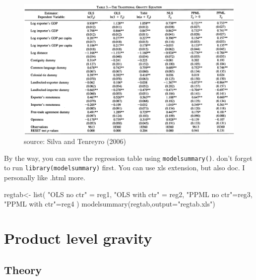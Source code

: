 \documentclass[
  a4paper,
  DIV=11,
  numbers=noendperiod]{scrreprt}
\newenvironment{Shaded}{\begin{snugshade}}{\end{snugshade}}
\newcommand{\AttributeTok}[1]{\textcolor[rgb]{0.40,0.45,0.13}{#1}}
\newcommand{\FunctionTok}[1]{\textcolor[rgb]{0.28,0.35,0.67}{#1}}
\newcommand{\NormalTok}[1]{\textcolor[rgb]{0.00,0.23,0.31}{#1}}
\newcommand{\OtherTok}[1]{\textcolor[rgb]{0.00,0.23,0.31}{#1}}
\newcommand{\StringTok}[1]{\textcolor[rgb]{0.13,0.47,0.30}{#1}}
\begin{document}
\begin{figure}

{\centering \includegraphics{pic2.png}

}

\caption{source: Silva and Tenreyro (2006)}

\end{figure}

By the way, you can save the regression table using
\texttt{modelsummary()}. don't forget to run
\texttt{library(modelsummary)} first. You can use xls extension, but
also doc. I personally like .html more.

\begin{Shaded}
\begin{Highlighting}[]
\NormalTok{regtab}\OtherTok{\textless{}{-}} \FunctionTok{list}\NormalTok{(}
  \StringTok{"OLS no ctr"} \OtherTok{=}\NormalTok{ reg1,}
  \StringTok{"OLS with ctr"}  \OtherTok{=}\NormalTok{ reg2,}
  \StringTok{"PPML no ctr"}\OtherTok{=}\NormalTok{reg3,}
  \StringTok{"PPML with ctr"}\OtherTok{=}\NormalTok{reg4}
\NormalTok{)}
\FunctionTok{modelsummary}\NormalTok{(regtab,}\AttributeTok{output=}\StringTok{"regtab.xls"}\NormalTok{)}
\end{Highlighting}
\end{Shaded}

\hypertarget{product-level-gravity}{%
\section{Product level gravity}\label{product-level-gravity}}

\hypertarget{theory-1}{%
\subsection{Theory}\label{theory-1}}
\end{document}
